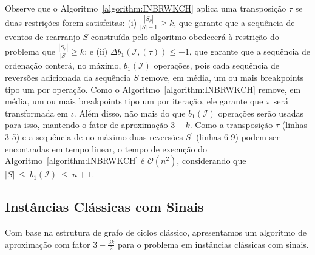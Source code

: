 

Observe que o Algoritmo~\ref{algorithm:INBRWKCH} aplica uma transposição $\tau$ se duas restrições forem satisfeitas: (i) $\frac{|S_{\rho}|}{|S| + 1} \ge k$, que garante que a sequência de eventos de rearranjo $S$ construída pelo algoritmo obedecerá à restrição do problema que $\frac{|S_{\rho}|}{|S|} \ge k$; e (ii) $\Delta b_1(\mathcal{I}, (\tau)) \le -1$, que garante que a sequência de ordenação conterá, no máximo, $b_1(\mathcal{I})$ operações, pois cada sequência de reversões adicionada da sequência $S$ remove, em média, um ou mais breakpoints tipo um por operação. Como o Algoritmo~\ref{algorithm:INBRWKCH} remove, em média, um ou mais breakpoints tipo um por iteração, ele garante que $\pi$ será transformada em $\iota$. Além disso, não mais do que $b_1(\mathcal{I})$ operações serão usadas para isso, mantendo o fator de aproximação $3-k$. Como a transposição $\tau$ (linhas 3-5) e a sequência de no máximo duas reversões $S^{\prime}$ (linhas 6-9) podem ser encontradas em tempo linear, o tempo de execução do Algoritmo~\ref{algorithm:INBRWKCH} é $\mathcal{O}(n^2)$, considerando que $|S|~\le~b_1(\mathcal{I})~\le~{n + 1}$.

\subsection{Instâncias Clássicas com Sinais}

Com base na estrutura de grafo de ciclos clássico, apresentamos um algoritmo de aproximação com fator $3-\frac{3k}{2}$ para o problema \SbPRT{} em instâncias clássicas com sinais.

